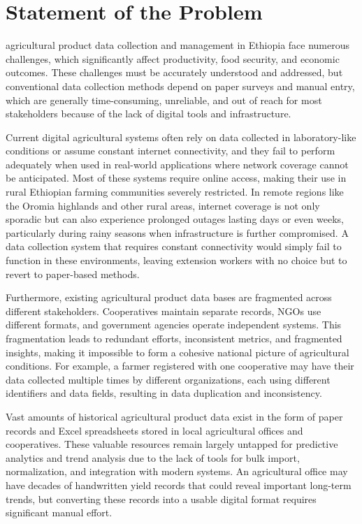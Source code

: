 \section{Statement of the Problem}

agricultural product data collection and management in Ethiopia face numerous challenges, which significantly affect productivity, food security, and economic outcomes. These challenges must be accurately understood and addressed, but conventional data collection methods depend on paper surveys and manual entry, which are generally time-consuming, unreliable, and out of reach for most stakeholders because of the lack of digital tools and infrastructure.

Current digital agricultural systems often rely on data collected in laboratory-like conditions or assume constant internet connectivity, and they fail to perform adequately when used in real-world applications where network coverage cannot be anticipated. Most of these systems require online access, making their use in rural Ethiopian farming communities severely restricted. In remote regions like the Oromia highlands and other rural areas, internet coverage is not only sporadic but can also experience prolonged outages lasting days or even weeks, particularly during rainy seasons when infrastructure is further compromised. A data collection system that requires constant connectivity would simply fail to function in these environments, leaving extension workers with no choice but to revert to paper-based methods.

Furthermore, existing agricultural product data bases are fragmented across different stakeholders. Cooperatives maintain separate records, NGOs use different formats, and government agencies operate independent systems. This fragmentation leads to redundant efforts, inconsistent metrics, and fragmented insights, making it impossible to form a cohesive national picture of agricultural conditions. For example, a farmer registered with one cooperative may have their data collected multiple times by different organizations, each using different identifiers and data fields, resulting in data duplication and inconsistency.

Vast amounts of historical agricultural product data exist in the form of paper records and Excel spreadsheets stored in local agricultural offices and cooperatives. These valuable resources remain largely untapped for predictive analytics and trend analysis due to the lack of tools for bulk import, normalization, and integration with modern systems. An agricultural office may have decades of handwritten yield records that could reveal important long-term trends, but converting these records into a usable digital format requires significant manual effort.

